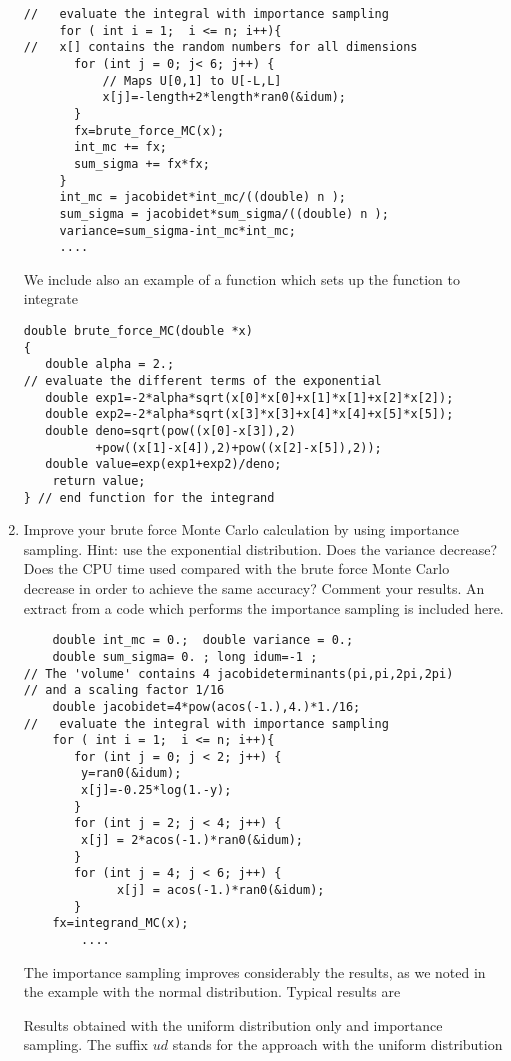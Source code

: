 \begin{prob}
\begin{enumerate}
\begin{lstlisting}
//   evaluate the integral with importance sampling    
     for ( int i = 1;  i <= n; i++){
//   x[] contains the random numbers for all dimensions
       for (int j = 0; j< 6; j++) {
           // Maps U[0,1] to U[-L,L]
           x[j]=-length+2*length*ran0(&idum); 
       }
       fx=brute_force_MC(x); 
       int_mc += fx;
       sum_sigma += fx*fx;
     }
     int_mc = jacobidet*int_mc/((double) n );
     sum_sigma = jacobidet*sum_sigma/((double) n );
     variance=sum_sigma-int_mc*int_mc;
     ....
\end{lstlisting}
We include also an example of a function which sets up the function to integrate
\begin{lstlisting}
double brute_force_MC(double *x) 
{
   double alpha = 2.;
// evaluate the different terms of the exponential
   double exp1=-2*alpha*sqrt(x[0]*x[0]+x[1]*x[1]+x[2]*x[2]);
   double exp2=-2*alpha*sqrt(x[3]*x[3]+x[4]*x[4]+x[5]*x[5]);
   double deno=sqrt(pow((x[0]-x[3]),2)
          +pow((x[1]-x[4]),2)+pow((x[2]-x[5]),2));
   double value=exp(exp1+exp2)/deno;
	return value;
} // end function for the integrand
\end{lstlisting}
\item Improve your brute force Monte Carlo calculation by using importance sampling.
Hint: use the exponential distribution.
Does the variance decrease? Does the CPU time used compared with the brute force 
Monte Carlo decrease in order to achieve the same accuracy? Comment your results.
An extract from a code which performs the importance sampling is included here.
\begin{lstlisting}
	double int_mc = 0.;  double variance = 0.;
	double sum_sigma= 0. ; long idum=-1 ;  
// The 'volume' contains 4 jacobideterminants(pi,pi,2pi,2pi) 
// and a scaling factor 1/16
	double jacobidet=4*pow(acos(-1.),4.)*1./16;
//   evaluate the integral with importance sampling    
	for ( int i = 1;  i <= n; i++){
	   for (int j = 0; j < 2; j++) {
		y=ran0(&idum);
		x[j]=-0.25*log(1.-y);
 	   }
	   for (int j = 2; j < 4; j++) {
		x[j] = 2*acos(-1.)*ran0(&idum); 
	   }
	   for (int j = 4; j < 6; j++) {
			 x[j] = acos(-1.)*ran0(&idum);
  	   }
	fx=integrand_MC(x); 
        ....
\end{lstlisting}
The importance sampling improves considerably the results, as we noted in the example with the 
normal distribution. Typical results are 
\begin{table}
\caption{Results obtained with the uniform distribution only and importance sampling.
The suffix $ud$ stands for the approach with the uniform distribution
}
\end{table}
\end{enumerate}
\end{prob}
